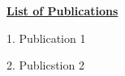 \null{}
\begin{center}
{\bf \Large \underline{List of Publications}}
\end{center}
\vspace{12mm}


1. Publication 1

2. Publicstion 2
